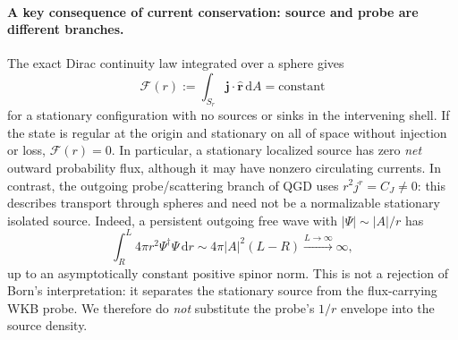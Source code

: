 \documentclass[11pt,a4paper]{article}
\newcommand{\dd}{\mathrm d}
\begin{document}
\paragraph{A key consequence of current conservation: source and probe are different branches.}
The exact Dirac continuity law integrated over a sphere gives
\begin{equation}\label{eq:qgd013-integrated-flux}
 \mathcal F(r):=\int_{S_r}\bm j\cdot\hat{\bm r}\,\dd A=\mathrm{constant}
\end{equation}
for a stationary configuration with no sources or sinks in the intervening shell. If the state is regular at the origin and stationary on all of space without injection or loss, $\mathcal F(r)=0$. In particular, a stationary localized source has zero \emph{net} outward probability flux, although it may have nonzero circulating currents. In contrast, the outgoing probe/scattering branch of QGD uses $r^2j^r=C_J\neq0$: this describes transport through spheres and need not be a normalizable stationary isolated source. Indeed, a persistent outgoing free wave with $|\Psi|\sim |A|/r$ has
\begin{equation}\label{eq:qgd013-nonnormal}
\int_R^L 4\pi r^2\Psi^\dagger\Psi\,\dd r\sim 4\pi|A|^2(L-R)\xrightarrow{L\to\infty}\infty,
\end{equation}
up to an asymptotically constant positive spinor norm. This is not a rejection of Born's interpretation: it separates the stationary source from the flux-carrying WKB probe. We therefore do \emph{not} substitute the probe's $1/r$ envelope into the source density.
\end{document}
